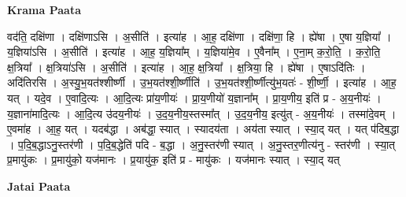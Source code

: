 \documentclass[17pt]{extarticle}
\begin{document}
\textbf{Krama Paata} \newline

वद॑ति॒ दक्षि॑णा । दक्षि॑णाऽसि । अ॒सीति॑ । इत्या॑ह । आ॒ह॒ दक्षि॑णा । दक्षि॑णा॒ हि । ह्ये॑षा । ए॒षा य॒ज्ञिया᳚ । य॒ज्ञिया॑ऽसि । अ॒सीति॑ । इत्या॑ह । आ॒ह॒ य॒ज्ञिया᳚म् । य॒ज्ञिया॑मे॒व । ए॒वैना᳚म् । ए॒ना॒म् क॒रो॒ति॒ । क॒रो॒ति॒ क्ष॒त्रिया᳚ । क्ष॒त्रिया॑ऽसि । अ॒सीति॑ । इत्या॑ह । आ॒ह॒ क्ष॒त्रिया᳚ । क्ष॒त्रिया॒ हि । ह्ये॑षा । ए॒षाऽदि॑तिः । अदि॑तिरसि । अ॒स्यु॒भ॒यत॑श्शीर्ष्णी । उ॒भ॒यत॑श्शी॒र्ष्णीति॑ । उ॒भ॒यत॑श्शी॒र्ष्णीत्यु॑भ॒यतः॑ - शी॒र्ष्णी॒ । इत्या॑ह । आ॒ह॒ यत् । यदे॒व । ए॒वादि॒त्यः । आ॒दि॒त्यः प्रा॑य॒णीयः॑ । प्रा॒य॒णीयो॑ य॒ज्ञाना᳚म् । प्रा॒य॒णीय॒ इति॑ प्र - अ॒य॒नीयः॑ । य॒ज्ञाना॑मादि॒त्यः । आ॒दि॒त्य उ॑दय॒नीयः॑ । उ॒द॒य॒नीय॒स्तस्मा᳚त् । उ॒द॒य॒नीय॒ इत्यु॑त् - अ॒य॒नीयः॑ । तस्मा॑दे॒वम् । ए॒वमा॑ह । आ॒ह॒ यत् । यदब॑द्धा । अब॑द्धा॒ स्यात् । स्यादय॑ता । अय॑ता स्यात् । स्या॒द् यत् । यत् प॑दिब॒द्धा । प॒दि॒ब॒द्धाऽनु॒स्तर॑णी । प॒दि॒ब॒द्धेति॑ पदि - ब॒द्धा । अ॒नु॒स्तर॑णी स्यात् । अ॒नु॒स्तर॒णीत्य॑नु - स्तर॑णी । स्या॒त् प्र॒मायु॑कः । प्र॒मायु॑को॒ यज॑मानः । प्र॒यायु॑क॒ इति॑ प्र - मायु॑कः । यज॑मानः स्यात् । स्या॒द् यत् \newline

\textbf{Jatai Paata} \newline
\end{document}
